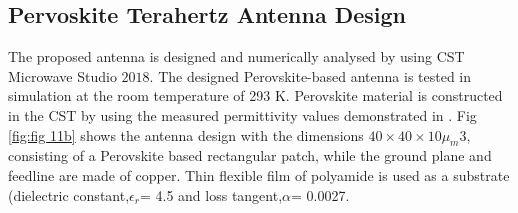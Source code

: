 \documentclass[12pt]{suhbook}
\begin{document}
\subsection{Pervoskite Terahertz Antenna Design}
The proposed antenna is designed and numerically analysed by using CST Microwave Studio $2018$. The designed Perovskite-based antenna is tested in simulation at the room temperature of 293 K. Perovskite material is constructed in the CST by using the measured permittivity values demonstrated in \cite{green2014emergence}. Fig \ref{fig:fig 11b} shows the antenna design with the dimensions $40 \times 40 \times 10 \mu_m 3$, consisting of a Perovskite based rectangular patch, while the ground plane and feedline are made of copper. Thin flexible film of polyamide is used as a substrate (dielectric constant,$ \epsilon_r $= 4.5 and loss tangent,$\alpha $= 0.0027.
\end{document}
